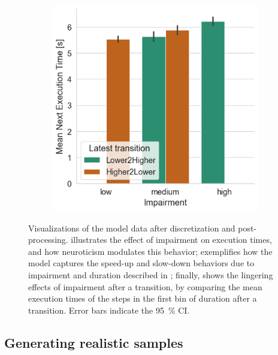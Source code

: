 \begin{figure}
\begin{subfigure}[t]{.28\textwidth}
        \caption{}\label{fig:timing:durvsetime}
    \end{subfigure}%
    \hspace{\fill}%
    \begin{subfigure}[t]{.28\textwidth}
        \centering
        \includegraphics[width=\textwidth]{./model_data/impairment_transition_vs_exectime.png}
        \caption{}\label{fig:timing:imptransvsetime}
    \end{subfigure}%
    \caption{%
        Visualizations of the model data after discretization and post-processing.
         illustrates the effect of impairment on execution times, and how neuroticism modulates this behavior;
         exemplifies how the model captures the speed-up and slow-down behaviors due to impairment and duration described in \textcite{olguinmunoz:impact2021};
        finally,  shows the lingering effects of impairment after a transition, by comparing the mean execution times of the steps in the first bin of duration after a transition.
        Error bars indicate the \SI{95}{\percent} \ac{CI}.
    }\label{fig:timing}
\end{figure}

\subsection{Generating realistic samples}\label{ssec:model:frames}

